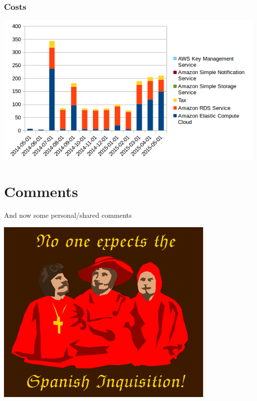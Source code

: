 \documentclass[14pt]{beamer}
\begin{document}
\begin{frame}
\frametitle{Costs}
\centering
\includegraphics[width=\textwidth]{awscosts.png}
\end{frame}

\section{Comments}
\begin{frame}
\centering
And now some personal/shared comments
\end{frame}

\begin{frame}
\centering
\includegraphics[width=0.8\textwidth]{inquisition.png}
\end{frame}
\end{document}
